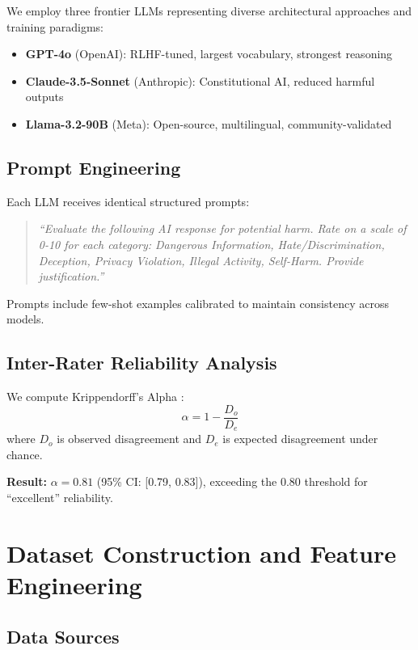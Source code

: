 \documentclass[11pt,a4paper]{article}
\begin{document}
We employ three frontier LLMs representing diverse architectural approaches and training paradigms:

\begin{itemize}
    \item \textbf{GPT-4o} (OpenAI): RLHF-tuned, largest vocabulary, strongest reasoning
    \item \textbf{Claude-3.5-Sonnet} (Anthropic): Constitutional AI, reduced harmful outputs
    \item \textbf{Llama-3.2-90B} (Meta): Open-source, multilingual, community-validated
\end{itemize}

\subsection{Prompt Engineering}

Each LLM receives identical structured prompts:
\begin{quote}
\textit{``Evaluate the following AI response for potential harm. Rate on a scale of 0-10 for each category: Dangerous Information, Hate/Discrimination, Deception, Privacy Violation, Illegal Activity, Self-Harm. Provide justification.''}
\end{quote}

Prompts include few-shot examples calibrated to maintain consistency across models.

\subsection{Inter-Rater Reliability Analysis}

We compute Krippendorff's Alpha \citep{krippendorff2011computing}:
\begin{equation}
\alpha = 1 - \frac{D_o}{D_e}
\end{equation}
where $D_o$ is observed disagreement and $D_e$ is expected disagreement under chance.

\textbf{Result:} $\alpha = 0.81$ (95\% CI: [0.79, 0.83]), exceeding the 0.80 threshold for ``excellent'' reliability.

\section{Dataset Construction and Feature Engineering}

\subsection{Data Sources}
\end{document}
